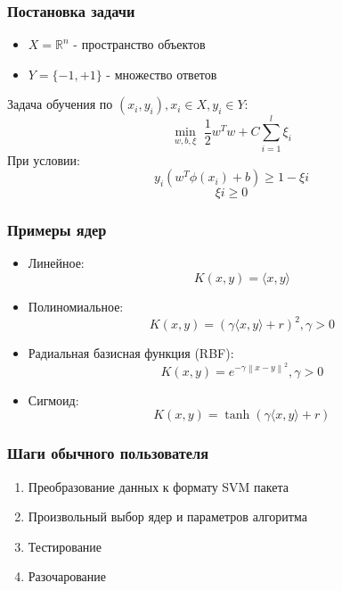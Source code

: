 
\begin{frame}
\frametitle{Постановка задачи}	
	\begin{itemize}
		\item $X = \mathbb{R}^{n}$ - пространство объектов
		\item $Y = \{-1, +1\}$ - множество ответов
	\end{itemize}

	Задача обучения по $(x_i, y_i), x_i \in X, y_i \in Y$:
	\begin{equation*}
	\min_{w, b, \xi} \,\, \frac{1}{2} w^{T}w +  C \sum_{i = 1}^{l}\xi_{i}
	\end{equation*}
	При условии:
	\begin{equation*}
	y_{i}(w^{T} \phi(x_i) + b) \ge 1 - \xi{i}
	\end{equation*}
	\begin{equation*}
	\xi{i} \ge 0
	\end{equation*}

\end{frame}


\begin{frame}
\frametitle{Примеры ядер}
	\begin{itemize}
		\item Линейное: 
		\begin{equation*}
			K(x,y) = \langle x, y \rangle
		\end{equation*}

		\item Полиномиальное:
		\begin{equation*}
			K(x,y) = (\gamma \langle x, y \rangle + r)^2, \gamma > 0
		\end{equation*}

		\item Радиальная базисная функция (RBF):
		\begin{equation*}
			 K(x,y)= e^{-\gamma\left \| x - y \right \|^{2}}, \gamma > 0
		\end{equation*}

		\item Сигмоид:
		\begin{equation*}
			K(x,y) = \tanh(\gamma \langle x, y \rangle + r)
		\end{equation*}

	\end{itemize}
\end{frame}

\begin{frame}
\frametitle{Шаги обычного пользователя}
	\begin{enumerate}
		\item Преобразование данных к формату SVM пакета
		\item Произвольный выбор ядер и параметров алгоритма
		\item Тестирование
		\item Разочарование
	\end{enumerate}
\end{frame}


